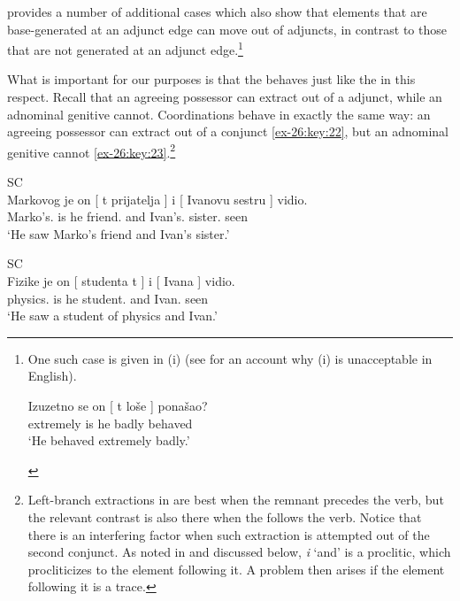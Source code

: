 \documentclass[output=paper]{langsci/langscibook}
\begin{document}
\textcite{Boskovic2018} provides a number of additional cases which also
show that elements that are base-generated at an adjunct edge can move out of
adjuncts, in contrast to those that are not generated at an adjunct
edge.\footnote{One such case is given in (i) (see \citealt{Boskovic2018} for
    an account why (i) is unacceptable in English).

\begin{exe}
    \gll    Izuzetno se on [ t loše ] ponašao?\\
            extremely is he {} {} badly {} behaved\\
    \glt    \enquote*{He behaved extremely badly.}
\end{exe}}

What is important for our purposes is that the  behaves just like the
 in this respect. Recall that an agreeing possessor can extract out of
a  adjunct, while an adnominal genitive cannot. Coordinations behave
in exactly the same way: an agreeing possessor can extract out of a conjunct
\eqref{ex-26:key:22}, but an adnominal genitive cannot \eqref{ex-26:key:23}.\footnote{Left-branch extractions
    in  are best when the remnant precedes the verb, but the relevant
    contrast is also there when the  follows the verb. Notice that
    there is an interfering factor when such extraction is attempted out of the
    second conjunct. As noted in \textcite{Stjepanovic2014} and discussed below,
    \emph{i} ‘and’ is a proclitic, which procliticizes to the element following
it. A problem then arises if the element following it is a trace.}

\ea\label{ex-26:key:22}\glsdesc{SC}\\
	\gll    Markovog je on [ t prijatelja ] i [ Ivanovu sestru ] vidio.\\
            Marko’s.\Acc{} is he {} {} friend.\Acc{} {} and {} Ivan’s.\Acc{}
            sister.\Acc{} {} seen\\
	\glt    \enquote*{He saw Marko’s friend and Ivan’s sister.}
\z

\ea\label{ex-26:key:23}\glsdesc{SC}\\
    \gll \llap{*}Fizike je on [ studenta t ] i [ Ivana ] vidio.\\
            physics.\Gen{} is he {} student.\Acc{} {} {} and {} Ivan.\Acc{} {} seen\\
    \glt    \enquote*{He saw a student of physics and Ivan.}%
\z
\end{document}
